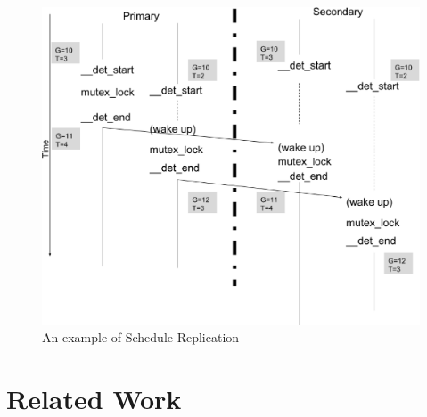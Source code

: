 \begin{figure}
\centering
\includegraphics[width=0.9\columnwidth]{figures/sched_rep}
\caption{An example of Schedule Replication}
\label{f:scherep}
\end{figure}

\section{Related Work}


